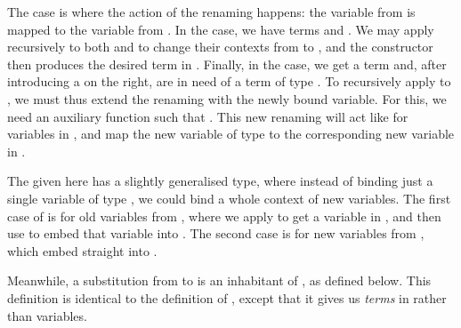 \rename{}

The  case is where the action of the renaming
happens: the variable  from \AgdaBound{$\Delta$} is mapped to the
variable \AgdaBound{$\rho$}\AgdaSpace{} from \AgdaBound{$\Gamma$}.
In the  case, we have terms 
\AgdaSymbol{:} \AgdaBound{$\Delta$} \AgdaDatatype{$\vdash$}
   and 
\AgdaSymbol{:} \AgdaBound{$\Delta$} \AgdaDatatype{$\vdash$} .
We may apply  \AgdaBound{$\rho$} recursively to both
 and  to change their contexts from
\AgdaBound{$\Delta$} to \AgdaBound{$\Gamma$}, and the
 constructor then produces the desired term in
\AgdaBound{$\Gamma$}.
Finally, in the  case, we get a term
 \AgdaSymbol{:} \DA{} \AgdaDatatype{$\vdash$}  and,
after introducing a  on the right, are in need
of a term of type \GA{} \AgdaDatatype{$\vdash$} .
To recursively apply  to , we must thus extend
the renaming \AgdaBound{$\rho$} \AgdaSymbol{:} \RenGD{} with the newly bound
variable.
For this, we need an auxiliary function  such that
 \AgdaBound{$\rho$} \AgdaSymbol{:} \RenGADA{}.
This new renaming will act like \AgdaBound{$\rho$} for variables in
\AgdaBound{$\Delta$}, and map the new variable of type  to the
corresponding new variable in \GA{}.

\bindRen{}

The  given here has a slightly generalised type, where
instead of binding just a single variable of type , we could
bind a whole context \AgdaBound{$\Theta$} of new variables.
The first case of  is for old variables from
\AgdaBound{$\Delta$}, where we apply \AgdaBound{$\rho$} to get a variable in
\AgdaBound{$\Gamma$}, and then use  to embed that variable
into \GTh{}.
The second case is for new variables from \AgdaBound{$\Theta$}, which embed
straight into \GTh{}.

Meanwhile, a substitution from \AgdaBound{$\Gamma$} to \AgdaBound{$\Delta$} is
an inhabitant of \AgdaSpace{}\AgdaBound{$\Gamma$}\AgdaSpace{}%
\AgdaBound{$\Delta$}, as defined below.
This definition is identical to the definition of , except
that it gives us \emph{terms} in \AgdaBound{$\Gamma$} rather than variables.

